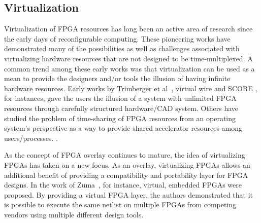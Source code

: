 \subsection{Virtualization}
Virtualization of FPGA resources has long been an active area of research since the early days of reconfigurable computing.  These pioneering works have demonstrated many of the possibilities as well as challenges associated with virtualizing hardware resources that are not designed to be time-multiplexed.  A common trend among these early works was that virtualization can be used as a mean to provide the designers and/or tools the illusion of having infinite hardware resources.  Early works by Trimberger et al~\cite{Trimberger97}, virtual wire\cite{virtualwire} and SCORE \cite{score}, for instances, gave the users the illusion of a system with unlimited FPGA resources through carefully structured hardware/CAD system.  Others have studied the problem of time-sharing of FPGA resources from an operating system's perspective as a way to provide shared accelerator resources among users/processes. \cite{Lubbers:2009:RMP:1596532.1596540,SoTECS08,Fu:2005:FCCM}.

As the concept of FPGA overlay continues to mature, the idea of virtualizing FPGAs has taken on a new focus.  As an overlay, virtualizing FPGAs allows an additional benefit of providing a compatibility and portability layer for FPGA designs.  In the work of Zuma~\cite{zuma2012}, for instance, virtual, embedded FPGAs were proposed.  By providing a virtual FPGA layer, the authors demonstrated that it is possible to execute the same netlist on multiple FPGAs from competing vendors using multiple different design tools.

\iffalse
\subsection{Improved Design Productivity}
An important benefit of using FPGA overlays is that they promise to improve designer's productivity in developing FPGA applications.
Design productivity is hard to measure, but has long been regarded as one of the key barrier-to-entry for novice users to start using FPGAs for their applications \cite{SoFpl06}.
In particular, FPGA overlays are particularly helpful in addressing two important aspects of this design productivity challenges: 
\begin{itemize}[nosep]
\item Reduced compilation time
\item Application debug
\end{itemize}
\fi

